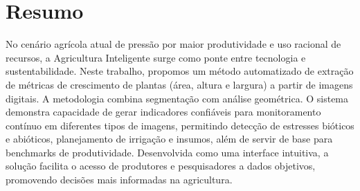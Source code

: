 \chapter*{Resumo}
 
No cenário agrícola atual de pressão por maior produtividade e uso racional de recursos, a Agricultura Inteligente surge como ponte entre tecnologia e sustentabilidade. Neste trabalho, propomos um método automatizado de extração de métricas de crescimento de plantas (área, altura e largura) a partir de imagens digitais. A metodologia combina segmentação com análise geométrica. O sistema demonstra capacidade de gerar indicadores confiáveis para monitoramento contínuo em diferentes tipos de imagens, permitindo detecção de estresses bióticos e abióticos, planejamento de irrigação e insumos, além de servir de base para benchmarks de produtividade. Desenvolvida como uma interface intuitiva, a solução facilita o acesso de produtores e pesquisadores a dados objetivos, promovendo decisões mais informadas na agricultura.
